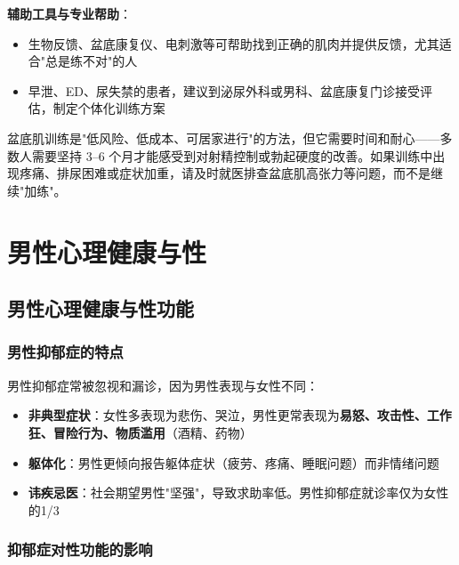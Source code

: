 \documentclass[12pt,a4paper,twoside]{ctexbook}
\begin{document}
\vspace{0.5em}
\noindent\textbf{辅助工具与专业帮助}：

\begin{itemize}[leftmargin=2cm]
	\item 生物反馈、盆底康复仪、电刺激等可帮助找到正确的肌肉并提供反馈，尤其适合"总是练不对"的人
	\item 早泄、ED、尿失禁的患者，建议到泌尿外科或男科、盆底康复门诊接受评估，制定个体化训练方案
\end{itemize}

\begin{tcolorbox}[colback=pink!5!white,colframe=red!50!black,title=贴心小叮咛]
盆底肌训练是"低风险、低成本、可居家进行"的方法，但它需要时间和耐心——多数人需要坚持 3--6 个月才能感受到对射精控制或勃起硬度的改善。如果训练中出现疼痛、排尿困难或症状加重，请及时就医排查盆底肌高张力等问题，而不是继续"加练"。
\end{tcolorbox}


\chapter{男性心理健康与性}

\section{男性心理健康与性功能}


\label{sec:male_mental_health}

\subsection{男性抑郁症的特点}

男性抑郁症常被忽视和漏诊，因为男性表现与女性不同：

\begin{itemize}[leftmargin=2cm]
	\item \textbf{非典型症状}：女性多表现为悲伤、哭泣，男性更常表现为\textbf{易怒、攻击性、工作狂、冒险行为、物质滥用}（酒精、药物）
	\item \textbf{躯体化}：男性更倾向报告躯体症状（疲劳、疼痛、睡眠问题）而非情绪问题
	\item \textbf{讳疾忌医}：社会期望男性"坚强"，导致求助率低。男性抑郁症就诊率仅为女性的1/3
\end{itemize}

\subsection{抑郁症对性功能的影响}
\end{document}

